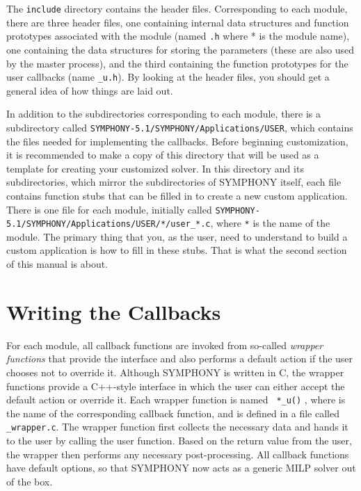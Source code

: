 The {\tt include} directory contains the header files. Corresponding
to each module, there are three header files, one containing internal
data structures and function prototypes associated with the module
(named {\tt *.h} where * is the module name), one containing the data
structures for storing the parameters (these are also used by the
master process), and the third containing the function prototypes for
the user callbacks (name {\tt *\_u.h}). By looking at the header files, you
should get a general idea of how things are laid out.

In addition to the subdirectories corresponding to each module, there is a
subdirectory called \texttt{SYMPHONY-5.1/SYMPHONY/Applications/USER}, which 
contains the files needed for implementing the callbacks. Before beginning
customization, it is recommended to make a copy of this directory that will 
be used as a template for creating your
customized solver. In this directory and its subdirectories, which mirror the
subdirectories of SYMPHONY itself, each file contains function stubs that can
be filled in to create a new custom application. There is one file for each
module, initially called 
\texttt{SYMPHONY-5.1/SYMPHONY/Applications/USER/*/user\_*.c}, where
\texttt{*} is the name of the module. The primary thing that you, as the user,
need to understand to build a custom application is how to fill in these
stubs. That is what the second section of this manual is about.

\section{Writing the Callbacks}

For each module, all callback functions are invoked from so-called \emph{wrapper
functions} that provide the interface and also performs a default action if
the user chooses not to override it. Although SYMPHONY is written in C, the
wrapper functions provide a C++-style interface in which the user can either
accept the default action or override it. Each wrapper function is named {\tt
*\_u()} , where {\tt *} is the name of the corresponding callback function, and is
defined in a file called {\tt *\_wrapper.c}. The wrapper function first
collects the necessary data and hands it to the user by calling the user
function. Based on the return value from the user, the wrapper then performs
any necessary post-processing. All callback functions have default options, so
that SYMPHONY now acts as a generic MILP solver out of the box.

